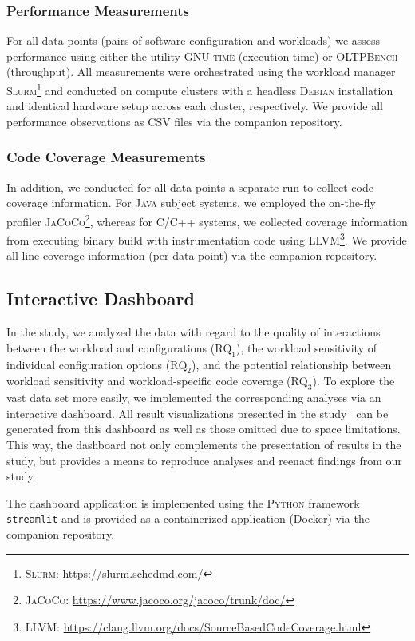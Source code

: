 \documentclass[10pt,conference]{IEEEtran}
\begin{document}
	\subsubsection{Performance Measurements}
	For all data points (pairs of software configuration and workloads) we assess performance using either the utility \textsc{GNU time} (execution time) or \textsc{OLTPBench}~\cite{difallah_oltp_2013} (throughput). All measurements were orchestrated using the workload manager \textsc{Slurm}\footnote{\textsc{Slurm}: \url{https://slurm.schedmd.com/}} and conducted on compute clusters with a headless \textsc{Debian} installation and identical hardware setup across each cluster, respectively. We provide all performance observations as CSV files via the companion repository.
	
	\subsubsection{Code Coverage Measurements}
	In addition, we conducted for all data points a separate run to collect code coverage information. For \textsc{Java} subject systems, we employed the on-the-fly profiler \textsc{JaCoCo}\footnote{\textsc{JaCoCo}: \url{https://www.jacoco.org/jacoco/trunk/doc/}}, whereas for \textsc{C/C++} systems, we collected coverage information from executing binary build with instrumentation code using LLVM\footnote{\textsc{LLVM}: \url{https://clang.llvm.org/docs/SourceBasedCodeCoverage.html}}. We provide all line coverage information (per data point) via the companion repository.
		
	\subsection{Interactive Dashboard}
	In the study, we analyzed the data with regard to the quality of interactions between the workload and configurations ($\text{RQ}_\text{1}$), the workload sensitivity of individual configuration options ($\text{RQ}_\text{2}$), and the potential relationship between workload sensitivity and workload-specific code coverage ($\text{RQ}_\text{3}$). To explore the vast data set more easily, we implemented the corresponding analyses via an interactive dashboard. All result visualizations presented in the study~\cite{muhlbauer_workload_2023} can be generated from this dashboard as well as those omitted due to space limitations. This way, the dashboard not only complements the presentation of results in the study, but provides a means to reproduce analyses and reenact findings from our study.
	
	The dashboard application is implemented using the \textsc{Python} framework \texttt{streamlit} and is provided as a containerized application (Docker) via the companion repository.
	
	
	
	
\end{document}
